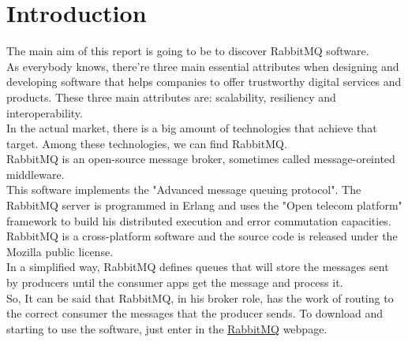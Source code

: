 \documentclass[12pt]{article}
\begin{document}
	\begin{titlepage}
		\maketitle
		\thispagestyle{empty}
	\end{titlepage}
	\cleardoublepage
	\newpage

\tableofcontents
\listoffigures
\thispagestyle{empty}

\newpage
\section*{Introduction}
The main aim of this report is going to be to discover RabbitMQ software.\\
As everybody knows, there're three main essential attributes when designing and developing software that helps companies to offer trustworthy digital services and products. These three main attributes are: scalability, resiliency and interoperability.\\
In the actual market, there is a big amount of technologies that achieve that target. Among these technologies, we can find RabbitMQ.\\
RabbitMQ is an open-source message broker, sometimes called message-oreinted middleware.\\
This software implements the "Advanced message queuing protocol". The RabbitMQ server is programmed in Erlang and uses the "Open telecom platform" framework to build his distributed execution and error commutation capacities.\\
RabbitMQ is a cross-platform software and the source code is released under the Mozilla public license.\\
In a simplified way, RabbitMQ defines queues that will store the messages sent by producers until the consumer apps get the message and process it.\\
So, It can be said that RabbitMQ, in his broker role, has the work of routing to the correct consumer the messages that the producer sends.
To download and starting to use the software, just enter in the \href{https://www.rabbitmq.com}{\underline{RabbitMQ}} webpage.
\end{document}
